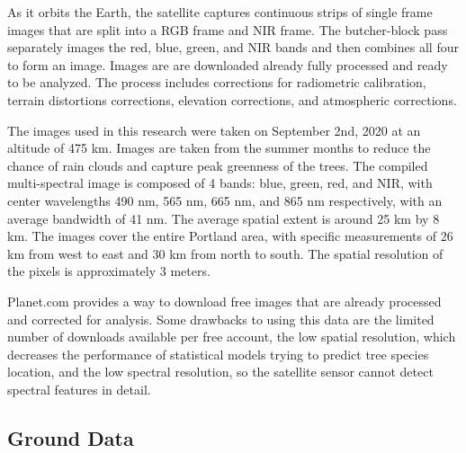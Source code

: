 \documentclass[12pt,twoside]{reedthesis}
\begin{document}
As it orbits the Earth, the satellite captures continuous strips of single frame images that are split into a RGB frame and NIR frame. The butcher-block pass separately images the red, blue, green, and NIR bands and then combines all four to form an image. Images are are downloaded already fully processed and ready to be analyzed. The process includes corrections for radiometric calibration, terrain distortions corrections, elevation corrections, and atmospheric corrections.

The images used in this research were taken on September 2nd, 2020 at an altitude of 475 km. Images are taken from the summer months to reduce the chance of rain clouds and capture peak greenness of the trees. The compiled multi-spectral image is composed of 4 bands: blue, green, red, and NIR, with center wavelengths 490 nm, 565 nm, 665 nm, and 865 nm respectively, with an average bandwidth of 41 nm. The average spatial extent is around 25 km by 8 km. The images cover the entire Portland area, with specific measurements of 26 km from west to east and 30 km from north to south. The spatial resolution of the pixels is approximately 3 meters.

Planet.com provides a way to download free images that are already processed and corrected for analysis. Some drawbacks to using this data are the limited number of downloads available per free account, the low spatial resolution, which decreases the performance of statistical models trying to predict tree species location, and the low spectral resolution, so the satellite sensor cannot detect spectral features in detail.

\hypertarget{ground-data}{%
\subsection{Ground Data}\label{ground-data}}
\end{document}

